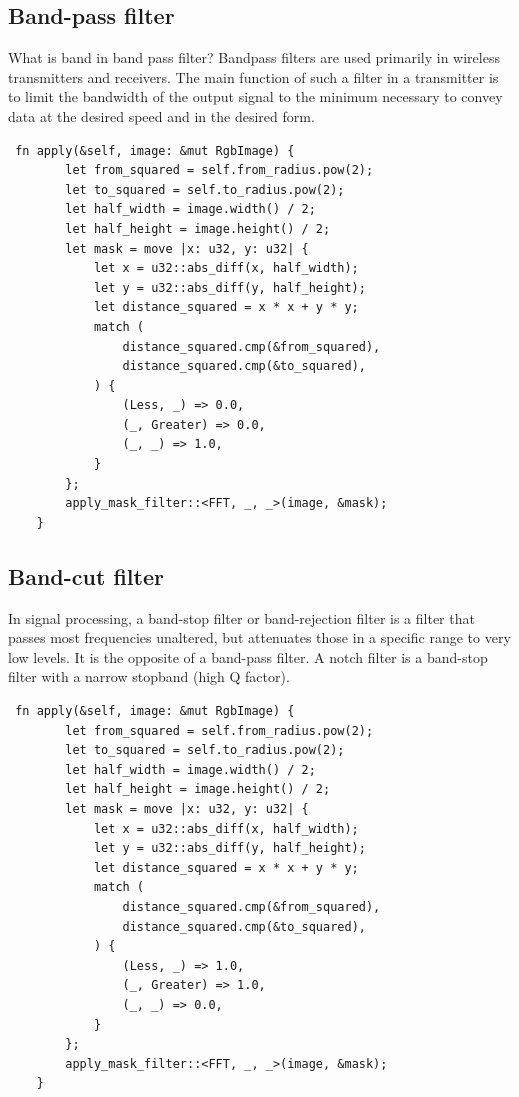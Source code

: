 \documentclass[12pt]{article}
\begin{document}
\subsection{Band-pass filter}
What is band in band pass filter?
Bandpass filters are used primarily in wireless transmitters and receivers. The main function of such a filter in a transmitter is to limit the bandwidth of the output signal to the minimum necessary to convey data at the desired speed and in the desired form.
\begin{lstlisting}
 fn apply(&self, image: &mut RgbImage) {
        let from_squared = self.from_radius.pow(2);
        let to_squared = self.to_radius.pow(2);
        let half_width = image.width() / 2;
        let half_height = image.height() / 2;
        let mask = move |x: u32, y: u32| {
            let x = u32::abs_diff(x, half_width);
            let y = u32::abs_diff(y, half_height);
            let distance_squared = x * x + y * y;
            match (
                distance_squared.cmp(&from_squared),
                distance_squared.cmp(&to_squared),
            ) {
                (Less, _) => 0.0,
                (_, Greater) => 0.0,
                (_, _) => 1.0,
            }
        };
        apply_mask_filter::<FFT, _, _>(image, &mask);
    }
\end{lstlisting}
\subsection{Band-cut filter}
In signal processing, a band-stop filter or band-rejection filter is a filter that passes most frequencies unaltered, but attenuates those in a specific range to very low levels. It is the opposite of a band-pass filter. A notch filter is a band-stop filter with a narrow stopband (high Q factor).
\begin{lstlisting}
 fn apply(&self, image: &mut RgbImage) {
        let from_squared = self.from_radius.pow(2);
        let to_squared = self.to_radius.pow(2);
        let half_width = image.width() / 2;
        let half_height = image.height() / 2;
        let mask = move |x: u32, y: u32| {
            let x = u32::abs_diff(x, half_width);
            let y = u32::abs_diff(y, half_height);
            let distance_squared = x * x + y * y;
            match (
                distance_squared.cmp(&from_squared),
                distance_squared.cmp(&to_squared),
            ) {
                (Less, _) => 1.0,
                (_, Greater) => 1.0,
                (_, _) => 0.0,
            }
        };
        apply_mask_filter::<FFT, _, _>(image, &mask);
    }
\end{lstlisting}
\end{document}
